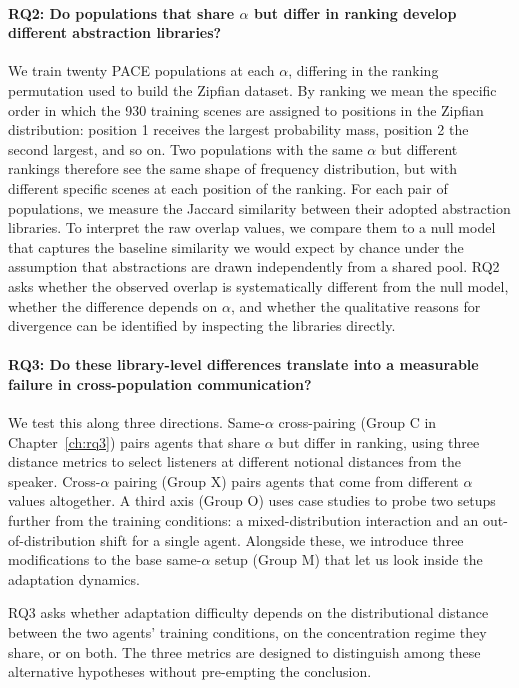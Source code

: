 \paragraph*{RQ2: Do populations that share $\alpha$ but differ in ranking develop different abstraction libraries?}

We train twenty PACE populations at each $\alpha$, differing in the ranking permutation used to build the Zipfian dataset. By ranking we mean the specific order in which the 930 training scenes are assigned to positions in the Zipfian distribution: position 1 receives the largest probability mass, position 2 the second largest, and so on. Two populations with the same $\alpha$ but different rankings therefore see the same shape of frequency distribution, but with different specific scenes at each position of the ranking. For each pair of populations, we measure the Jaccard similarity between their adopted abstraction libraries. To interpret the raw overlap values, we compare them to a null model that captures the baseline similarity we would expect by chance under the assumption that abstractions are drawn independently from a shared pool. RQ2 asks whether the observed overlap is systematically different from the null model, whether the difference depends on $\alpha$, and whether the qualitative reasons for divergence can be identified by inspecting the libraries directly.

\paragraph*{RQ3: Do these library-level differences translate into a measurable failure in cross-population communication?}

We test this along three directions. Same-$\alpha$ cross-pairing (Group C in Chapter~\ref{ch:rq3}) pairs agents that share $\alpha$ but differ in ranking, using three distance metrics to select listeners at different notional distances from the speaker. Cross-$\alpha$ pairing (Group X) pairs agents that come from different $\alpha$ values altogether. A third axis (Group O) uses case studies to probe two setups further from the training conditions: a mixed-distribution interaction and an out-of-distribution shift for a single agent. Alongside these, we introduce three modifications to the base same-$\alpha$ setup (Group M) that let us look inside the adaptation dynamics.

RQ3 asks whether adaptation difficulty depends on the distributional distance between the two agents' training conditions, on the concentration regime they share, or on both. The three metrics are designed to distinguish among these alternative hypotheses without pre-empting the conclusion.


